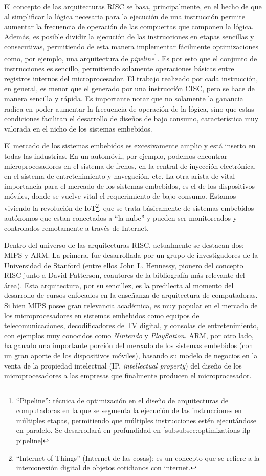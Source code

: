 El concepto de las arquitecturas RISC se basa, principalmente, en el hecho de
que al simplificar la lógica necesaria para la ejecución de una instrucción
permite aumentar la frecuencia de operación de las compuertas que componen la
lógica. Además, es posible dividir la ejecución de las instrucciones en etapas
sencillas y consecutivas, permitiendo de esta manera implementar fácilmente
optimizaciones como, por ejemplo, una arquitectura de
\emph{pipeline}\footnote{``Pipeline'': técnica de optimización en el diseño de 
arquitecturas de computadoras en la que se segmenta la ejecución de las 
instrucciones en múltiples etapas, permitiendo que múltiples instrucciones 
estén ejecutándose en paralelo. Se desarrollará en profundidad en
\ref{subsubsec:optimizations-ilp-pipeline}}. Es por esto que el conjunto de 
instrucciones es sencillo, permitiendo solamente operaciones básicas entre 
registros internos del microprocesador. El trabajo realizado por cada 
instrucción, en general, es menor que el generado por una instrucción CISC, pero 
se hace de manera sencilla y rápida. Es importante notar que no solamente la 
ganancia radica en poder aumentar la frecuencia de operación de la lógica, sino 
que estas condiciones facilitan el desarrollo de diseños de bajo consumo, 
característica muy valorada en el nicho de los sistemas embebidos.

El mercado de los sistemas embebidos es excesivamente amplio y está inserto en
todas las industrias. En un automóvil, por ejemplo, podemos encontrar
microprocesadores en el sistema de frenos, en la central de inyección
electrónica, en el sistema de entretenimiento y navegación, etc. La otra arista
de vital importancia para el mercado de los sistemas embebidos, es el de los
dispositivos móviles, donde se vuelve vital el requerimiento de bajo consumo.
Estamos viviendo la revolución de IoT\footnote{``Internet of Things'' (Internet
de las cosas): es un concepto que se refiere a la interconexión digital de
objetos cotidianos con internet.}, que se trata básicamente de sistemas
embebidos autónomos que estan conectados a ``la nube'' y pueden ser monitoreados
y controlados remotamente a través de Internet.

Dentro del universo de las arquitecturas RISC, actualmente se destacan dos: MIPS
y ARM. La primera, fue desarrollada por un grupo de investigadores de la
Universidad de Stanford (entre ellos John L. Hennessy, pionero del concepto RISC
junto a David Patterson, coautores de la bibliografía más relevante del área).
Esta arquitectura, por su sencillez, es la predilecta al momento del desarrollo
de cursos enfocados en la enseñanza de arquitectura de computadoras. Si bien
MIPS posee gran relevancia académica, es muy popular en el mercado de los
microprocesadores en sistemas embebidos como equipos de telecomunicaciones,
decodificadores de TV digital, y consolas de entretenimiento, con ejemplos muy
conocidos como \emph{Nintendo} y \emph{PlaySation}. ARM, por otro lado, ha
ganado una importante porción del mercado de los sistemas embebidos (con un gran
aporte de los dispositivos móviles), basando su modelo de negocios en la venta
de la propiedad intelectual (IP, \emph{intellectual property}) del diseño de los
microprocesadores a las empresas que finalmente producen el microprocesador.


